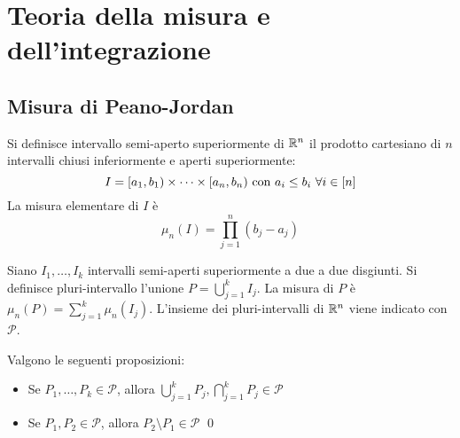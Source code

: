 \chapter{Teoria della misura e dell'integrazione}

\section{Misura di Peano-Jordan}

\begin{definition}
    Si definisce intervallo semi-aperto superiormente di $\mathbb{R}^n$ il prodotto cartesiano di $n$ intervalli chiusi inferiormente e aperti superiormente:
    \begin{equation*}
        I=[a_1,b_1)\times\cdots\times[a_n,b_n) \text{ con } a_i \leq b_i \ \forall i \in [n]
    \end{equation*}
    La misura elementare di $I$ è
    \begin{equation*}
        \mu_n(I)=\prod_{j=1}^n(b_j-a_j)
    \end{equation*}
\end{definition}

\begin{definition}
    Siano $I_1,\dots,I_k$ intervalli semi-aperti superiormente a due a due disgiunti. Si definisce pluri-intervallo l'unione $\displaystyle P=\bigcup_{j=1}^kI_j$. La misura di $P$ è $\mu_n(P)=\displaystyle \sum_{j=1}^k\mu_n(I_j)$. 
    L'insieme dei pluri-intervalli di $\mathbb{R}^n$ viene indicato con $\mathcal{P}$.
\end{definition}

\begin{lemma}
    Valgono le seguenti proposizioni:
    \begin{itemize}
        \item Se $P_1,\dots,P_k \in \mathcal{P}$, allora $\displaystyle \bigcup_{j=1}^k P_j, \bigcap_{j=1}^kP_j \in \mathcal{P}$
        \item Se $P_1,P_2 \in \mathcal{P}$, allora $P_2 \setminus P_1 \in \mathcal{P}$
        \qed
    \end{itemize}
\end{lemma}

